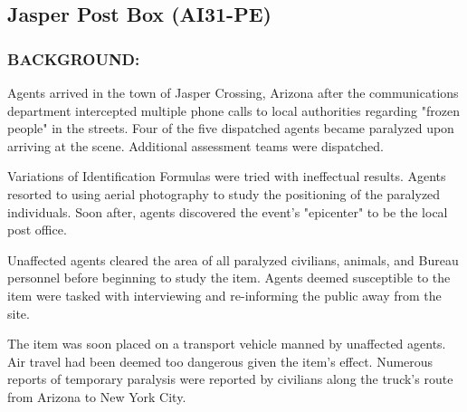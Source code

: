 \subsection*{Jasper Post Box (AI31-PE)}
\subsubsection*{BACKGROUND:}
\par Agents arrived in the town of Jasper Crossing, Arizona after the
communications department intercepted multiple phone calls to
local authorities regarding "frozen people" in the streets. Four of
the five dispatched agents became paralyzed upon arriving at the
scene. Additional assessment teams were dispatched.
\par Variations of Identification Formulas were tried with ineffectual
results. Agents resorted to using aerial photography to study the
positioning of the paralyzed individuals. Soon after, agents
discovered the event's "epicenter" to be the local post office.
\par Unaffected agents cleared the area of all paralyzed civilians,
animals, and Bureau personnel before beginning to study the
item. Agents deemed susceptible to the item were tasked with
interviewing and re-informing the public away from the site.
\par The item was soon placed on a transport vehicle manned by
unaffected agents. Air travel had been deemed too dangerous
given the item's effect. Numerous reports of temporary paralysis
were reported by civilians along the truck's route from Arizona to
New York City.